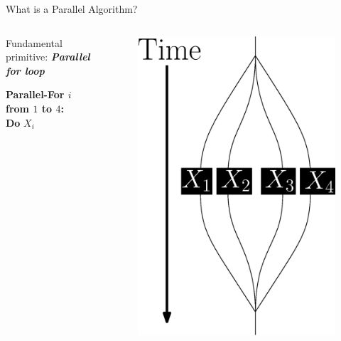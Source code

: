 \documentclass[xcolor=x11names, svgnames, rgb]{beamer}
\newcommand{\defn}[1]       {{\textit{\textbf{\boldmath #1}}}}
\begin{document}
\begin{frame}[t]{What is a Parallel Algorithm?}

	\begin{columns}[T] %
	\begin{column}{.45\textwidth}
	Fundamental primitive: \defn{Parallel for loop}
	\vspace{2cm}

        \textbf{Parallel-For $i$ from $1$ to $4$: } \\
        \hspace{1 cm} \textbf{Do }$X_i$


	\end{column}
	\hfill
	\begin{column}{.60\textwidth}
	\begin{figure}
		\includegraphics[width=0.75\linewidth]{imgs/parallelForLoop/altParallelForLoop.eps}
	\end{figure}
	\end{column}
	\end{columns}

\end{frame}
\end{document}
